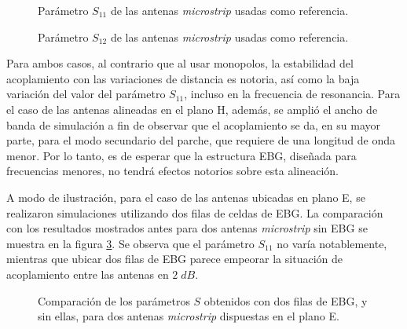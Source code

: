 \begin{figure}[H]
	\centering 
	\caption{Parámetro $S_{11}$ de las antenas \textit{microstrip} usadas como referencia.}
	\label{fig:sinebg-s11-microstrip}
\end{figure}



\begin{figure}[H]
	\centering 
	\caption{Parámetro $S_{12}$ de las antenas \textit{microstrip} usadas como referencia.}
	\label{fig:sinebg-s12-microstrip}
\end{figure}

Para ambos casos, al contrario que al usar monopolos, la estabilidad del acoplamiento con las variaciones de distancia es notoria, así como la baja variación del valor del parámetro $S_{11}$, incluso en la frecuencia de resonancia. Para el caso de las antenas alineadas en el plano H, además, se amplió el ancho de banda de simulación a fin de observar que el acoplamiento se da, en su mayor parte, para el modo secundario del parche, que requiere de una longitud de onda menor. Por lo tanto, es de esperar que la estructura EBG, diseñada para frecuencias menores, no tendrá efectos notorios sobre esta alineación.


A modo de ilustración, para el caso de las antenas ubicadas en plano E, se realizaron simulaciones utilizando dos filas de celdas de EBG. La comparación con los resultados mostrados antes para dos antenas \textit{microstrip} sin EBG se muestra en la figura \ref{fig:planoh-2ebg-comparacion}. Se observa que el parámetro $S_{11}$ no varía notablemente, mientras que ubicar dos filas de EBG parece empeorar la situación de acoplamiento entre las antenas en $2\; dB$.

\begin{figure}[H]
	\centering 
	\caption{Comparación de los parámetros $S$ obtenidos con dos filas de EBG, y sin ellas, para dos antenas \textit{microstrip} dispuestas en el plano E.}
	\label{fig:planoh-2ebg-comparacion}
\end{figure}

